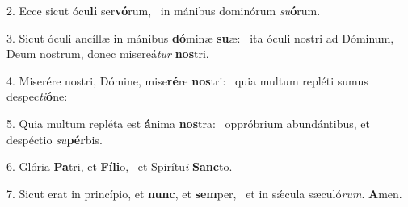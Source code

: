 2. Ecce sicut ócu\textbf{li} ser\textbf{vó}rum, \ast\  in mánibus dominórum \textit{su}\textbf{ó}rum.\

3. Sicut óculi ancíllæ in mánibus \textbf{dó}minæ \textbf{su}æ: \ast\  ita óculi nostri ad Dóminum, Deum nostrum, donec misereá\textit{tur} \textbf{nos}tri.\

4. Miserére nostri, Dómine, mise\textbf{ré}re \textbf{nos}tri: \ast\  quia multum repléti sumus despec\textit{ti}\textbf{ó}ne:\

5. Quia multum repléta est \textbf{á}nima \textbf{nos}tra: \ast\  oppróbrium abundántibus, et despéctio \textit{su}\textbf{pér}bis.\

6. Glória \textbf{Pa}tri, et \textbf{Fí}\textbf{li}o, \ast\  et Spirítu\textit{i} \textbf{Sanc}to.\

7. Sicut erat in princípio, et \textbf{nunc}, et \textbf{sem}per, \ast\  et in sǽcula sæculó\textit{rum}. \textbf{A}men.\

